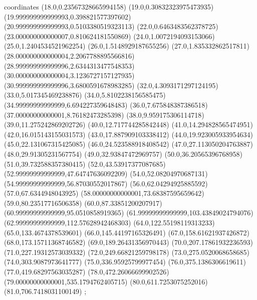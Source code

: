 coordinates {%
(18.0,0.23567328665994158)
(19.0,0.30832323975473935)
(19.999999999999993,0.398821577397602)
(20.999999999999993,0.5103380519323113)
(22.0,0.6463483562378725)
(23.000000000000007,0.810624181550869)
(24.0,1.0072194093153066)
(25.0,1.2404534521962254)
(26.0,1.5148929187655256)
(27.0,1.835332862517811)
(28.000000000000004,2.2067788895566816)
(28.999999999999996,2.6344313477548353)
(30.000000000000004,3.1236727157127935)
(30.999999999999996,3.6800591678983285)
(32.0,4.3093171297124195)
(33.0,5.017345469238876)
(34.0,5.8102238156585475)
(34.99999999999999,6.694227359648483)
(36.0,7.675848387386518)
(37.00000000000001,8.76182473285398)
(38.0,9.959175306114718)
(39.0,11.275242869202726)
(40.0,12.717744285842448)
(41.0,14.294828565474951)
(42.0,16.015143155031573)
(43.0,17.887909103338412)
(44.0,19.923005933954634)
(45.0,22.131067315425085)
(46.0,24.523588918408542)
(47.0,27.113050204763887)
(48.0,29.91305231567754)
(49.0,32.93847472969757)
(50.0,36.20565396768958)
(51.0,39.732588357380415)
(52.0,43.53917377087685)
(52.99999999999999,47.64747636092209)
(54.0,52.08204970687131)
(54.99999999999999,56.87030552017867)
(56.0,62.04294925885592)
(57.0,67.6344948043925)
(58.00000000000001,73.68387595659642)
(59.0,80.23517716506358)
(60.0,87.33851200207917)
(60.99999999999999,95.0510858919365)
(61.99999999999999,103.43849024794076)
(62.99999999999999,112.57628942468303)
(64.0,122.55198119313233)
(65.0,133.4674378539601)
(66.0,145.44197165326491)
(67.0,158.61621937426872)
(68.0,173.15711368746582)
(69.0,189.26431356970443)
(70.0,207.17861932236593)
(71.0,227.19312573039332)
(72.0,249.66821259798178)
(73.0,275.0520068658685)
(74.0,303.9087973641777)
(75.0,336.95925799977454)
(76.0,375.1386306619611)
(77.0,419.68297563035287)
(78.0,472.26066699902526)
(79.00000000000001,535.1794762405715)
(80.0,611.7253075252016)
(81.0,706.7418031100149)
};
